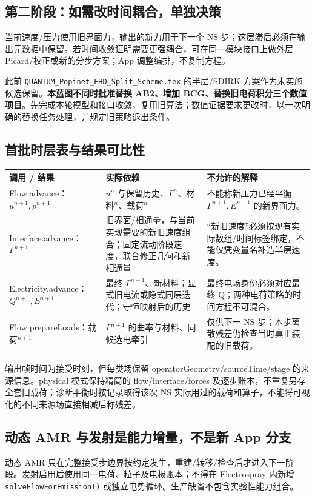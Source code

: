 \documentclass[UTF8,a4paper,11pt,fontset=fandol]{ctexart}
\numberwithin{equation}{section}
\newcommand{\code}[1]{\nolinkurl{#1}}
\begin{document}
\subsection{第二阶段：如需改时间耦合，单独决策}
当前速度/压力使用旧界面力，输出的新力用于下一个 NS 步；这层滞后必须在输出元数据中保留。若时间收敛证明需要更强耦合，可在同一模块接口上做外层 Picard/校正或新的分步方案；App 调整编排，不复制方程。

此前 \code{QUANTUM_Popinet_EHD_Split_Scheme.tex} 的半层/SDIRK 方案作为未实施候选保留。\textbf{本蓝图不同时批准替换 AB2、增加 BCG、替换旧电荷积分三个数值项目}。先完成本轮模型和接口收敛，复用旧算法；数值证据要求更改时，以一次明确的替换任务处理，并规定旧策略退出条件。

\subsection{首批时层表与结果可比性}
\begin{longtable}{@{}P{.22\textwidth}P{.36\textwidth}P{.36\textwidth}@{}}
\toprule 调用 / 结果 & 实际依赖 & 不允许的解释\\\midrule\endhead
Flow.advance：$u^{n+1},p^{n+1}$ & $u^n$ 与保留历史、$\Gamma^n$、材料$^n$、载荷$^n$ & 不能称新压力已经平衡 $\Gamma^{n+1},E^{n+1}$ 的新界面力。\\
Interface.advance：$\Gamma^{n+1}$ & 旧界面/相通量，与当前实现需要的新旧速度组合；固定流动阶段速度，联合修正几何和新相通量 & “新旧速度”必须按现有实际数组/时间标签绑定，不能仅凭变量名补造半层速度。\\
Electricity.advance：$Q^{n+1},E^{n+1}$ & 最终 $\Gamma^{n+1}$、新材料；显式旧电流或隐式同层迭代；守恒映射后的历史 & 最终电场身份必须对应最终 Q；两种电荷策略的时间方程不可混合。\\
Flow.prepareLoads：载荷$^{n+1}$ & $\Gamma^{n+1}$ 的曲率与材料、同候选电牵引 & 仅供下一 NS 步；本步离散残差仍检查当时真正装配的旧载荷。\\
\bottomrule
\end{longtable}
输出帧时间为接受时刻，但每类场保留 operatorGeometry/sourceTime/stage 的来源信息。physical 模式保持精简的 flow/interface/forces 及逐步账本，不重复另存全套旧载荷；诊断平衡时按记录取得该次 NS 实际用过的载荷和算子，不能将可视化的不同来源场直接相减后称残差。

\subsection{动态 AMR 与发射是能力增量，不是新 App 分支}
动态 AMR 只在完整接受步边界按约定发生，重建/转移/检查后才进入下一阶段。发射启用后使用同一电荷、粒子及电极账本；不得在 Electrospray 内新增 \code{solveFlowForEmission()} 或独立电势循环。生产缺省不包含实验性能力组合。
\end{document}

